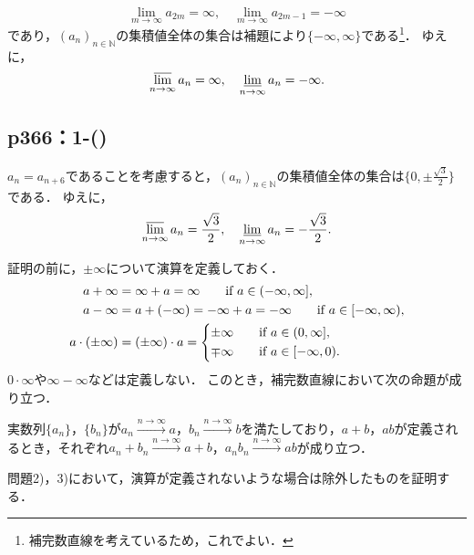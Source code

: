 \begin{tanswer}
    \[
        \lim_{m \to \infty} a_{2m} = \infty , \quad \lim_{m \to \infty} a_{2m-1} = -\infty
    \]
    であり，$(a_n)_{n \in \mathbb{N}}$の集積値全体の集合は補題により$\{ -\infty , \infty \}$である\footnote{補完数直線を考えているため，これでよい．}．
    ゆえに，
    \[
        \varlimsup_{n \to \infty} a_n = \infty , \quad \varliminf_{n \to \infty} a_n =-\infty.
    \]
\end{tanswer}

\subsection*{p366：1-()}

\begin{tanswer}
    $ a_{n} = a_{n+6}$であることを考慮すると，$(a_n)_{n \in \mathbb{N}}$の集積値全体の集合は$\{ 0 , \pm \frac{\sqrt{3}}{2} \}$である．
    ゆえに，
    \[
        \varlimsup_{n \to \infty} a_n = \frac{\sqrt{3}}{2} , \quad \varliminf_{n \to \infty} a_n =-\frac{\sqrt{3}}{2}.
    \]
\end{tanswer}



証明の前に，$\pm \infty$について演算を定義しておく．
\begin{align*}
    a + \infty           & = \infty + a = \infty \qquad \text{if $a \in (-\infty,\infty]$},                   \\
    a - \infty           & = a + (-\infty) = -\infty + a = -\infty \qquad \text{if $a \in [-\infty,\infty)$}, \\
    a \cdot (\pm \infty) & = (\pm \infty) \cdot a =
    \begin{cases*}
        \pm \infty \quad & if $a \in (0,\infty]$,  \\
        \mp \infty \quad & if $a \in [-\infty,0)$.
    \end{cases*}
\end{align*}
$0 \cdot \infty$や$\infty - \infty$などは定義しない．
このとき，補完数直線において次の命題が成り立つ．
\begin{lemma}{}{}
    実数列$\{a_n\}$，$\{b_n\}$が$a_n \xrightarrow{n \to \infty} a$，$b_n \xrightarrow{n \to \infty} b$を満たしており，$a+b$，$ab$が定義されるとき，それぞれ$a_n + b_n \xrightarrow{n \to \infty} a+b$，$a_n b_n \xrightarrow{n \to \infty} ab$が成り立つ．
\end{lemma}
問題2)，3)において，演算が定義されないような場合は除外したものを証明する．


